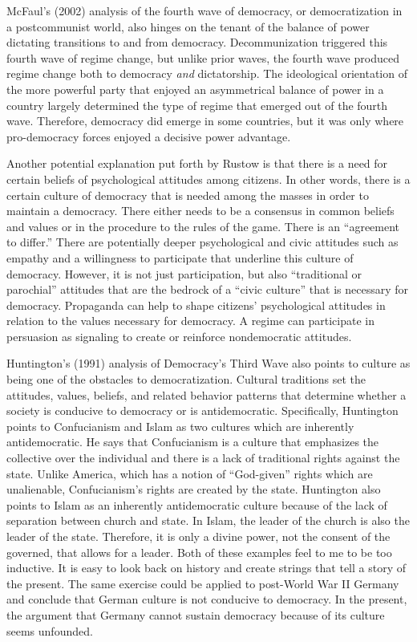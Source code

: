 \documentclass[12pt,]{article}
\begin{document}
McFaul's (2002) analysis of the fourth wave of democracy, or
democratization in a postcommunist world, also hinges on the tenant of
the balance of power dictating transitions to and from democracy.
Decommunization triggered this fourth wave of regime change, but unlike
prior waves, the fourth wave produced regime change both to democracy
\emph{and} dictatorship. The ideological orientation of the more
powerful party that enjoyed an asymmetrical balance of power in a
country largely determined the type of regime that emerged out of the
fourth wave. Therefore, democracy did emerge in some countries, but it
was only where pro-democracy forces enjoyed a decisive power advantage.

Another potential explanation put forth by Rustow is that there is a
need for certain beliefs of psychological attitudes among citizens. In
other words, there is a certain culture of democracy that is needed
among the masses in order to maintain a democracy. There either needs to
be a consensus in common beliefs and values or in the procedure to the
rules of the game. There is an ``agreement to differ.'' There are
potentially deeper psychological and civic attitudes such as empathy and
a willingness to participate that underline this culture of democracy.
However, it is not just participation, but also ``traditional or
parochial'' attitudes that are the bedrock of a ``civic culture'' that
is necessary for democracy. Propaganda can help to shape citizens'
psychological attitudes in relation to the values necessary for
democracy. A regime can participate in persuasion as signaling to create
or reinforce nondemocratic attitudes.

Huntington's (1991) analysis of Democracy's Third Wave also points to
culture as being one of the obstacles to democratization. Cultural
traditions set the attitudes, values, beliefs, and related behavior
patterns that determine whether a society is conducive to democracy or
is antidemocratic. Specifically, Huntington points to Confucianism and
Islam as two cultures which are inherently antidemocratic. He says that
Confucianism is a culture that emphasizes the collective over the
individual and there is a lack of traditional rights against the state.
Unlike America, which has a notion of ``God-given'' rights which are
unalienable, Confucianism's rights are created by the state. Huntington
also points to Islam as an inherently antidemocratic culture because of
the lack of separation between church and state. In Islam, the leader of
the church is also the leader of the state. Therefore, it is only a
divine power, not the consent of the governed, that allows for a leader.
Both of these examples feel to me to be too inductive. It is easy to
look back on history and create strings that tell a story of the
present. The same exercise could be applied to post-World War II Germany
and conclude that German culture is not conducive to democracy. In the
present, the argument that Germany cannot sustain democracy because of
its culture seems unfounded.
\end{document}
